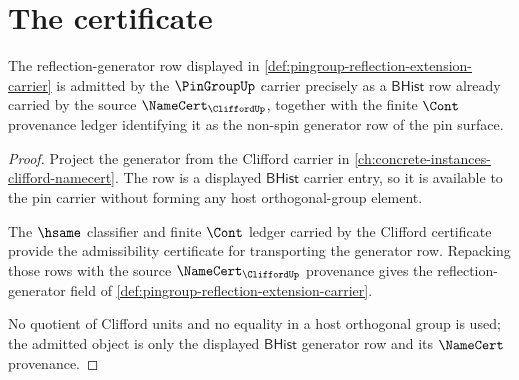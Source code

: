 \section{The certificate}
\label{sec:pingroup-certificate}

\begin{theorem}
\label{thm:pingroup-reflection-generator-carrier}
The reflection-generator row displayed in
\autoref{def:pingroup-reflection-extension-carrier} is admitted by the
$\PinGroupUp$ carrier precisely as a $\mathsf{BHist}$ row already carried by the
source $\NameCert_{\CliffordUp}$, together with the finite $\Cont$ provenance
ledger identifying it as the non-spin generator row of the pin surface.
\end{theorem}
\begin{proof}
Project the generator from the Clifford carrier in
\autoref{ch:concrete-instances-clifford-namecert}.  The row is a displayed
$\mathsf{BHist}$ carrier entry, so it is available to the pin carrier without
forming any host orthogonal-group element.

The $\hsame$ classifier and finite $\Cont$ ledger carried by the Clifford
certificate provide the admissibility certificate for transporting the
generator row.  Repacking those rows with the source $\NameCert_{\CliffordUp}$
provenance gives the reflection-generator field of
\autoref{def:pingroup-reflection-extension-carrier}.

No quotient of Clifford units and no equality in a host orthogonal group is
used; the admitted object is only the displayed $\mathsf{BHist}$ generator row
and its $\NameCert$ provenance.
\end{proof}

